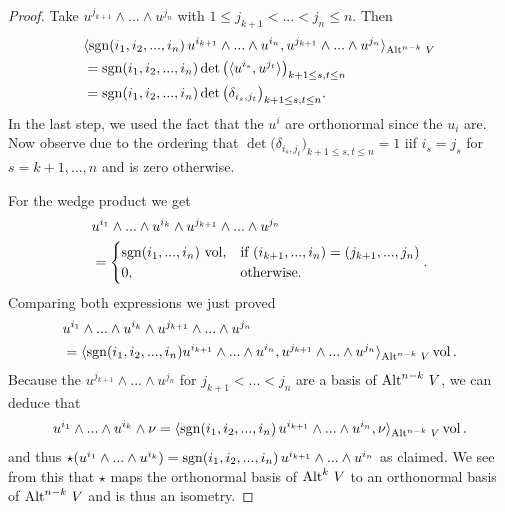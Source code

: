 \documentclass[../master_thesis.tex]{subfiles}
\begin{document}
\begin{proof}
    Take $u^{j_{k+1}} \wedge ... \wedge u^{j_n}$ with 
    $1 \leq j_{k+1} < ... < j_n \leq n$. Then 
    \begin{align*}
        &\langle \operatorname{sgn}(i_1,i_2,...,i_n) \, u^{i_{k+1}} \wedge ... \wedge u^{i_{n}},
            u^{j_{k+1}} \wedge ... \wedge u^{j_{n}} \rangle_{{\operatorname{Alt}^{n-k}\,V}}
        \\ &= \operatorname{sgn}(i_1,i_2,...,i_n) \det \big( \langle u^{i_s}, u^{j_t} \rangle \big)_{k+1 \leq s,t \leq n}
        \\ &= \operatorname{sgn}(i_1,i_2,...,i_n) \det \big( \delta_{i_s,j_t} \big)_{k+1 \leq s,t \leq n}.
    \end{align*}
    In the last step, we used the fact that the $u^i$ are orthonormal since the $u_i$ 
    are. Now observe due to the ordering that 
    $\det \big( \delta_{i_s,j_t} \big)_{k+1 \leq s,t \leq n} = 1$ iif
    $i_s = j_s$ for $s = k+1,...,n$ and is zero otherwise.

    For the wedge product we get
    \begin{align*}
        &u^{i_1} \wedge ... \wedge u^{i_{k}} \wedge u^{j_{k+1}} \wedge ... 
            \wedge u^{j_n}
        \\ &=   \begin{cases}
                \operatorname{sgn}(i_1, ..., i_n)\, \operatorname{vol}, & \text{if $(i_{k+1},...,i_n) = (j_{k+1},...,j_n)$} \\
                0,  & \text{otherwise.}
            \end{cases}.
    \end{align*}
    Comparing both expressions we just proved
    \begin{align*}
        &u^{i_1} \wedge ... \wedge u^{i_{k}} \wedge u^{j_{k+1}} \wedge ... \wedge u^{j_n}
        \\ &= \langle \operatorname{sgn}(i_1,i_2,...,i_n) u^{i_{k+1}} \wedge ... \wedge u^{i_{n}},
            u^{j_{k+1}} \wedge ... \wedge u^{j_{n}} \rangle_{{\operatorname{Alt}^{n-k}\,V}} \operatorname{vol}.
    \end{align*}
    Because the $u^{j_{k+1}} \wedge ... \wedge u^{j_n}$ for $j_{k+1} < ... < j_n$ are a 
    basis of ${\operatorname{Alt}^{n-k}\,V}$, we can deduce that 
    \begin{align*}
        u^{i_1} \wedge ... \wedge u^{i_{k}} \wedge \nu = \langle \operatorname{sgn}(i_1,i_2,...,i_n)\, u^{i_{k+1}} \wedge 
        ... \wedge u^{i_{n}}, \nu \rangle_{{\operatorname{Alt}^{n-k}\,V}} \operatorname{vol}.
    \end{align*}
    and thus  
    $\star (u^{i_1} \wedge ... \wedge u^{i_{k}}) = 
    \operatorname{sgn}(i_1,i_2,...,i_n)\, u^{i_{k+1}} \wedge ... \wedge u^{i_{n}}$ as claimed.
    We see from this that $\star$ maps the orthonormal basis of ${\operatorname{Alt}^{k}\,V}$ 
    to an orthonormal
    basis of ${\operatorname{Alt}^{n-k}\,V}$ and is thus an isometry.


\end{proof}
\end{document}
